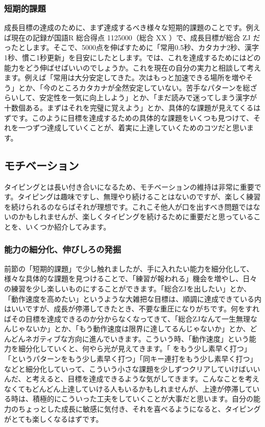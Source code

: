 \subsubsection*{短期的課題}

成長目標の達成のために、まず達成するべき様々な短期的課題のことです。例えば現在の記録が国語R 総合得点 1125000（総合 XX ）で、成長目標が総合 ZJ だったとします。そこで、5000点を伸ばすために「常用0.5秒、カタカナ2秒、漢字1秒、慣こ1秒更新」を目安にしたとします。では、これを達成するためにはどの能力をどう伸ばせばいいのでしょうか。これを現在の自分の実力と相談して考えます。例えば「常用は大分安定してきた。次はもっと加速できる場所を増やそう」とか、「今のところカタカナが全然安定していない。苦手なパターンを総ざらいして、安定性を一気に向上しよう」とか、「まだ読みで迷ってしまう漢字が十数個ある。まずはそれを完璧に覚えよう」とか、具体的な課題が見えてくるはずです。このように目標を達成するための具体的な課題をいくつも見つけて、それを一つずつ達成していくことが、着実に上達していくためのコツだと思います。

\subsection{モチベーション}

タイピングとは長い付き合いになるため、モチベーションの維持は非常に重要です。タイピングは趣味ですし、無理やり続けることはないのですが、楽しく練習を続けられるのならばそれが理想です。これこそ他人が口を出すべき問題ではないのかもしれませんが、楽しくタイピングを続けるために重要だと思っていることを、いくつか紹介してみます。

\subsubsection*{能力の細分化、伸びしろの発掘}

前節の「短期的課題」で少し触れましたが、手に入れたい能力を細分化して、様々な具体的な課題を見つけることで、「練習が報われる」機会を増やし、日々の練習を少し楽しいものにすることができます。「総合ZJを出したい」とか、「動作速度を高めたい」というような大雑把な目標は、順調に達成できている内はいいですが、成長が停滞してきたとき、不要な重圧になりがちです。何をすればその目標を達成できるのか分からなくなってきて、「総合ZJなんて一生無理なんじゃないか」とか、「もう動作速度は限界に達してるんじゃないか」とか、どんどんネガティブな方向に進んでいきます。こういう時、「動作速度」という能力を細分化していくと、何やら光が見えてきます。「 をもう少し素早く打つ」「というパターンをもう少し素早く打つ」「同キー連打をもう少し素早く打つ」などと細分化していって、こういう小さな課題を少しずつクリアしていけばいいんだ、と考えると、目標を達成できるような気がしてきます。こんなことを考えなくてもどんどん上達していける人もいるかもしれませんが、上達が停滞している時は、積極的にこういった工夫をしていくことが大事だと思います。自分の能力のちょっとした成長に敏感に気付き、それを喜べるようになると、タイピングがとても楽しくなるはずです。

